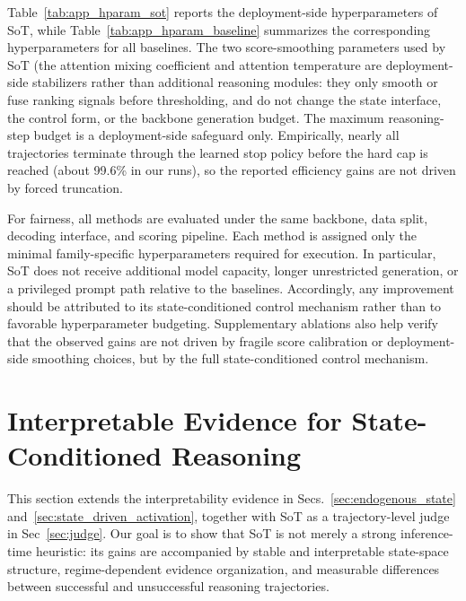 Table~\ref{tab:app_hparam_sot} reports the deployment-side hyperparameters of SoT, while Table~\ref{tab:app_hparam_baseline} summarizes the corresponding hyperparameters for all baselines.
The two score-smoothing parameters used by SoT (the attention mixing coefficient and attention temperature are deployment-side stabilizers rather than additional reasoning modules: they only smooth or fuse ranking signals before thresholding, and do not change the state interface, the control form, or the backbone generation budget.
The maximum reasoning-step budget is a deployment-side safeguard only.
Empirically, nearly all trajectories terminate through the learned stop policy before the hard cap is reached (about 99.6\% in our runs), so the reported efficiency gains are not driven by forced truncation.

For fairness, all methods are evaluated under the same backbone, data split, decoding interface, and scoring pipeline.
Each method is assigned only the minimal family-specific hyperparameters required for execution.
In particular, SoT does not receive additional model capacity, longer unrestricted generation, or a privileged prompt path relative to the baselines.
Accordingly, any improvement should be attributed to its state-conditioned control mechanism rather than to favorable hyperparameter budgeting.
Supplementary ablations also help verify that the observed gains are not driven by fragile score calibration or deployment-side smoothing choices, but by the full state-conditioned control mechanism.

\clearpage
{}

\section{Interpretable Evidence for State-Conditioned Reasoning}
\label{app:interpretability}

This section extends the interpretability evidence in Secs.~\ref{sec:endogenous_state} and~\ref{sec:state_driven_activation}, together with SoT as a trajectory-level judge in Sec~\ref{sec:judge}.
Our goal is to show that SoT is not merely a strong inference-time heuristic: its gains are accompanied by stable and interpretable state-space structure, regime-dependent evidence organization, and measurable differences between successful and unsuccessful reasoning trajectories.

